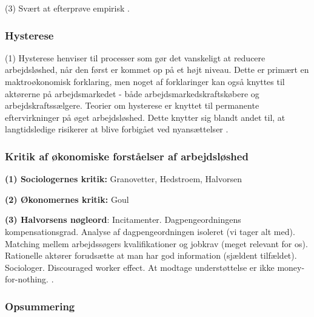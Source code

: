(3) Svært at efterprøve empirisk \parencite[33]{Halvorsen1999}.



\subsubsection{\textbf{Hysterese} \parencite[32-33]{Halvorsen1999}}

(1) Hysterese henviser til processer som gør det vanskeligt at reducere arbejdsløshed, når den først er kommet op på et højt niveau. Dette er primært en maktroøkonomisk forklaring, men noget af forklaringer kan også knyttes til aktørerne på arbejdsmarkedet - både arbejdsmarkedskraftskøbere og arbejdskraftssælgere. Teorier om hysterese er knyttet til permanente eftervirkninger på øget arbejdsløshed. Dette knytter sig blandt andet til, at langtidsledige risikerer at blive forbigået ved nyansættelser \parencite[32-33]{Halvorsen1999}.


\subsubsection{Kritik af økonomiske forståelser af arbejdsløshed \parencite[33-36]{Halvorsen1999}}

\noindent \textbf{(1) Sociologernes kritik:} Granovetter, Hedstroem, Halvorsen

\noindent \textbf{(2) Økonomernes kritik:} Goul

\noindent \textbf{(3) Halvorsens nøgleord}: Incitamenter. Dagpengeordningens kompensationsgrad. Analyse af dagpengeordningen isoleret (vi tager alt med). Matching mellem arbejdssøgers kvalifikationer og jobkrav (meget relevant for os). Rationelle aktører forudsætte at man har god information (sjældent tilfældet). Sociologer. Discouraged worker effect. At modtage understøttelse er ikke money-for-nothing. . \parencite[33-36]{Halvorsen1999}


\subsubsection{Opsummering}

